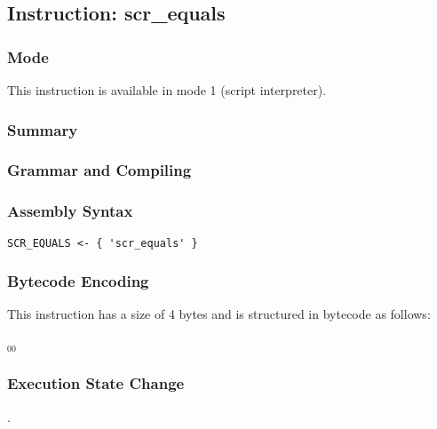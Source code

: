 \subsection{Instruction: scr\_equals}

\subsubsection{Mode}
This instruction is available in mode 1 (script interpreter).
\subsubsection{Summary}


\subsubsection{Grammar and Compiling}


\subsubsection{Assembly Syntax}

\begin{myquote}
\begin{verbatim}
SCR_EQUALS <- { 'scr_equals' }
\end{verbatim}
\end{myquote}

\subsubsection{Bytecode Encoding}

This instruction has a size of 4 bytes and is structured in bytecode as follows:

$_{00}$\ 


\subsubsection{Execution State Change}

.


